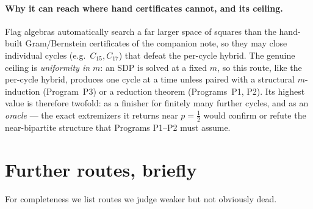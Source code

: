 \documentclass[11pt]{article}
\theoremstyle{definition}
\newcommand{\1}{\mathbf{1}}
\begin{document}
\paragraph{Why it can reach where hand certificates cannot, and its ceiling.}
Flag algebras automatically search a far larger space of squares than the
hand-built Gram/Bernstein certificates of the companion note, so they may close
individual cycles (e.g.\ $C_{15},C_{17}$) that defeat the per-cycle hybrid. The
genuine ceiling is \emph{uniformity in $m$}: an SDP is solved at a fixed $m$, so
this route, like the per-cycle hybrid, produces one cycle at a time unless paired
with a structural $m$-induction (Program~P3) or a reduction theorem
(Programs~P1, P2). Its highest value is therefore twofold: as a finisher for
finitely many further cycles, and as an \emph{oracle} --- the exact extremizers it
returns near $p=\tfrac12$ would confirm or refute the near-bipartite structure
that Programs P1--P2 must assume.

\section{Further routes, briefly}\label{sec:further}

For completeness we list routes we judge weaker but not obviously dead.
\end{document}
